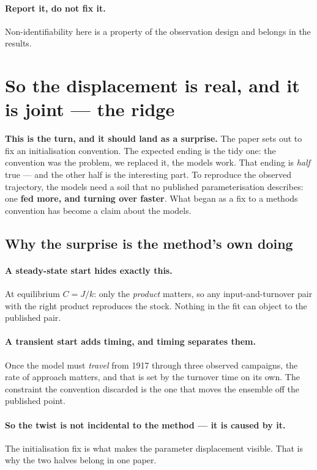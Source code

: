 \documentclass[11pt]{article}
\begin{document}
\paragraph{Report it, do not fix it.} Non-identifiability here is a property of the observation
design and belongs in the results.


\section{So the displacement is real, and it is joint --- the ridge}
\begin{note}
\textbf{This is the turn, and it should land as a surprise.} The paper sets out to fix an
initialisation convention. The expected ending is the tidy one: the convention was the problem, we
replaced it, the models work. That ending is \emph{half} true --- and the other half is the
interesting part. To reproduce the observed trajectory, the models need a soil that no published
parameterisation describes: one \textbf{fed more, and turning over faster}. What began as a fix to a
methods convention has become a claim about the models.
\end{note}

\subsection{Why the surprise is the method's own doing}
\paragraph{A steady-state start hides exactly this.} At equilibrium $C = J/k$: only the
\emph{product} matters, so any input-and-turnover pair with the right product reproduces the stock.
Nothing in the fit can object to the published pair.

\paragraph{A transient start adds timing, and timing separates them.} Once the model must
\emph{travel} from 1917 through three observed campaigns, the rate of approach matters, and that is
set by the turnover time on its own. The constraint the convention discarded is the one that moves
the ensemble off the published point.

\paragraph{So the twist is not incidental to the method --- it is caused by it.} The initialisation
fix is what makes the parameter displacement visible. That is why the two halves belong in one paper.
\end{document}
